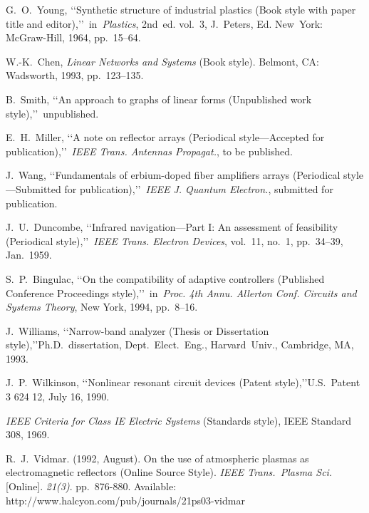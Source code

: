 \documentclass[conference,a4paper,twocolumn]{IEEEtran}
\begin{document}
\begin{thebibliography}{99}

 G.~O.~Young, \lq\lq Synthetic structure of industrial plastics (Book style with paper title and editor),\rq\rq~in~\emph{Plastics}, 2nd~ed. vol.~3, J.~Peters, Ed. New~York: McGraw-Hill, 1964, pp.~15--64.

 W.-K.~Chen, \emph{Linear Networks and Systems} (Book style).	Belmont, CA: Wadsworth, 1993, pp.~123--135.

 B.~Smith, \lq\lq An approach to graphs of linear forms (Unpublished work style),\rq\rq~unpublished.

 E.~H.~Miller, \lq\lq A note on reflector arrays (Periodical style---Accepted for publication),\rq\rq~\emph{IEEE Trans. Antennas Propagat.}, to be published.

 J.~Wang, \lq\lq Fundamentals of erbium-doped fiber amplifiers arrays (Periodical style---Submitted for publication),\rq\rq~\emph{IEEE J. Quantum Electron.}, submitted for publication.

 J.~U.~Duncombe, \lq\lq Infrared navigation---Part I: An assessment of feasibility (Periodical style),\rq\rq~\emph{IEEE Trans. Electron Devices}, vol.~11, no.~1, pp.~34--39, Jan.~1959.

 S.~P.~Bingulac, \lq\lq On the compatibility of adaptive controllers (Published Conference Proceedings style),\rq\rq~in~\emph{Proc. 4th Annu. Allerton Conf. Circuits and Systems Theory}, New York, 1994, pp.~8--16.

 J.~Williams, \lq\lq Narrow-band analyzer (Thesis or Dissertation style),\rq\rq Ph.D.~dissertation, Dept.~Elect.~Eng., Harvard~Univ., Cambridge, MA, 1993. 

 J.~P.~Wilkinson, \lq\lq Nonlinear resonant circuit devices (Patent style),\rq\rq U.S.~Patent 3 624 12, July 16, 1990. 

 \emph{IEEE Criteria for Class IE Electric Systems} (Standards style), IEEE Standard 308, 1969.

 R.~J.~Vidmar. (1992, August). On the use of atmospheric plasmas as electromagnetic reflectors (Online Source Style). \emph{IEEE Trans.~Plasma Sci.} [Online]. \emph{21(3)}. pp.~876-880. Available: http://www.halcyon.com/pub/journals/21ps03-vidmar

\end{thebibliography}


\end{document}
